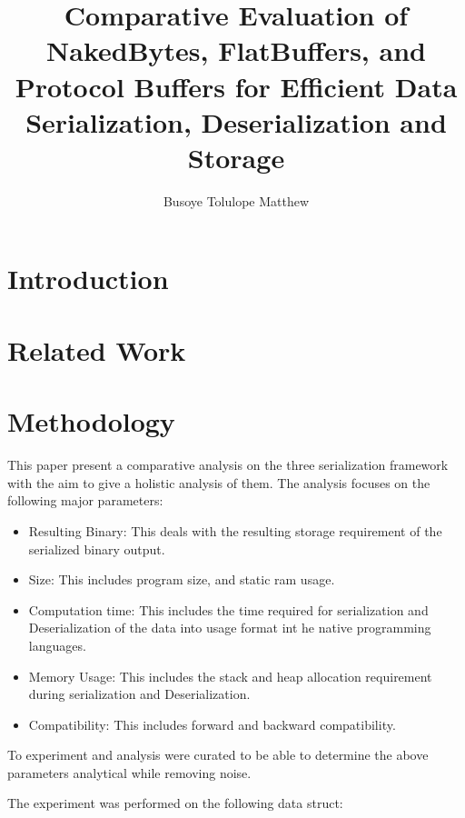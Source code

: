 \documentclass[11pt, a4paper]{article}
\title{ Comparative Evaluation of NakedBytes, FlatBuffers, and Protocol Buffers for Efficient Data Serialization, Deserialization and Storage}
\author{Busoye Tolulope Matthew}
\begin{document}
\maketitle
\begin{abstract}

\end{abstract}

\section{Introduction}

\section{Related Work}

\section{Methodology}
This paper present a comparative analysis on the three serialization framework with the aim to give a holistic analysis of them.
The analysis focuses on the following major parameters:
\begin{itemize}
    \item {Resulting Binary}: This deals with the resulting storage requirement of the serialized binary output.
    \item {Size}: This includes program size, and static ram usage.
    \item {Computation time}: This includes the time required for serialization and Deserialization of the data into usage format int he native programming languages.
    \item {Memory Usage}: This includes the stack and heap allocation requirement during serialization and Deserialization.
    \item {Compatibility}: This includes forward and backward compatibility.
\end{itemize}

To experiment and analysis were curated to be able to determine the above parameters analytical while removing noise.

The experiment was performed on the following data struct:
\end{document}
